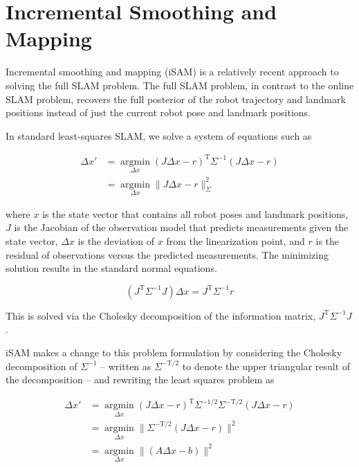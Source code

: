 \documentclass[conference]{IEEEtran}
\begin{document}
\section{Incremental Smoothing and Mapping}
\label{sec:incrementalsmoothingandmapping}


Incremental smoothing and mapping (iSAM) is a relatively recent approach to solving the
full SLAM problem. \cite{Kaess08tro} The full SLAM problem, in contrast to the online SLAM
problem, recovers the full posterior of the robot trajectory and landmark positions
instead of just the current robot pose and landmark positions. \cite{thrun2005probabilistic}

In standard least-squares SLAM, we solve a system of equations such as

\begin{align*}
  \Delta x' &= \underset{\Delta x}{\operatorname{argmin}} (J\Delta x - r)^{\text{T}}
\Sigma^{-1} (J\Delta x - r) \\
  &= \underset{\Delta x}{\operatorname{argmin}} \| J\Delta x - r \|^2_{\Sigma}
\end{align*}

where $x$ is the state vector that contains all robot poses and
landmark positions, $J$ is the Jacobian of the observation model that
predicts measurements given the state vector, $\Delta x$ is the
deviation of $x$ from the linearization point, and $r$ is the residual
of observations versus the predicted measurements. The minimizing
solution results in the standard normal equations.

\[
(J^{\text{T}} \Sigma^{-1} J) \Delta x = J^{\text{T}} \Sigma^{-1}r
\]

This is solved via the Cholesky decomposition of the information matrix,
$J^{\text{T}}\Sigma^{-1}J$.

iSAM makes a change to this problem formulation by considering the Cholesky decomposition
of $\Sigma^{-1}$ -- written as $\Sigma^{-\text{T}/2}$ to denote the upper triangular
result of the decomposition --  and rewriting the least squares problem as

\begin{align*}
    \Delta x' &= \underset{\Delta x}{\operatorname{argmin}} (J\Delta x - r)^{\text{T}}
\Sigma^{-1/2}\Sigma^{-\text{T}/2} (J\Delta x - r) \\
  &= \underset{\Delta x}{\operatorname{argmin}} \| \Sigma^{-\text{T}/2}(J\Delta x - r)
  \|^2\\
&= \underset{\Delta x}{\operatorname{argmin}} \| (A\Delta x - b)\|^2
\end{align*}
\end{document}
